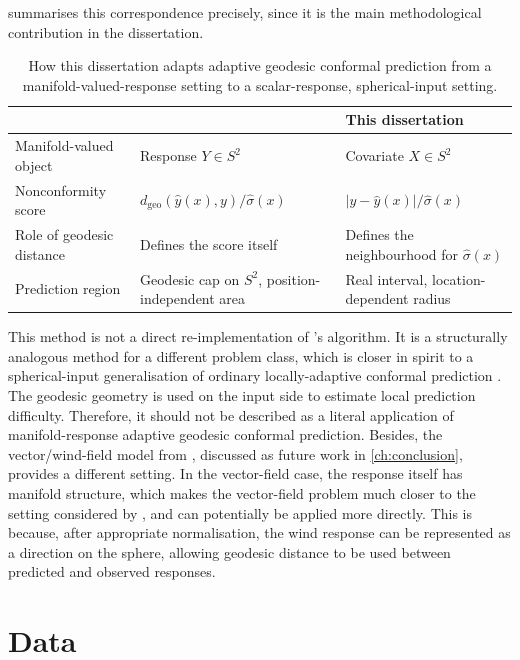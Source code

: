 \documentclass[11pt,a4paper]{report}
\newcommand{\dgeo}{d_{\mathrm{geo}}}
\begin{document}
 summarises this correspondence precisely, since it is the main methodological contribution in the dissertation.
\begin{table}[H]
\centering
\caption{How this dissertation adapts adaptive geodesic conformal prediction from a manifold-valued-response setting to a scalar-response, spherical-input setting.}
\label{tab:adaptation-summary}
\begin{tabular}{p{3.6cm}p{5.1cm}p{5.1cm}}
\toprule
& \citet{amirishahbazi2026} & This dissertation \\
\midrule
Manifold-valued object & Response $Y \in S^2$ & Covariate $X \in S^2$ \\
Nonconformity score & $\dgeo(\hat y(x),y)/\hat\sigma(x)$ & $|y-\hat y(x)|/\hat\sigma(x)$ \\
Role of geodesic distance & Defines the score itself & Defines the neighbourhood for $\hat\sigma(x)$ \\
Prediction region & Geodesic cap on $S^2$, position-independent area & Real interval, location-dependent radius \\
\bottomrule
\end{tabular}
\end{table}

This method is not a direct re-implementation of \citet{amirishahbazi2026}'s algorithm. It is a structurally analogous method for a different problem class, which is closer in spirit to a spherical-input generalisation of ordinary locally-adaptive conformal prediction \citep{lei2018,romano2019}. The geodesic geometry is used on the input side to estimate local prediction difficulty. Therefore, it should not be described as a literal application of manifold-response adaptive geodesic conformal prediction. Besides, the vector/wind-field model from \citet{thomas2025}, discussed as future work in \cref{ch:conclusion}, provides a different setting.  In the vector-field case, the response itself has manifold structure, which makes the vector-field problem much closer to the setting considered by \citet{amirishahbazi2026}, and can potentially be applied more directly. This is because, after appropriate normalisation, the wind response can be represented as a direction on the sphere, allowing geodesic distance to be used between predicted and observed responses.
 
\chapter{Data}
\label{ch:data}
\end{document}
